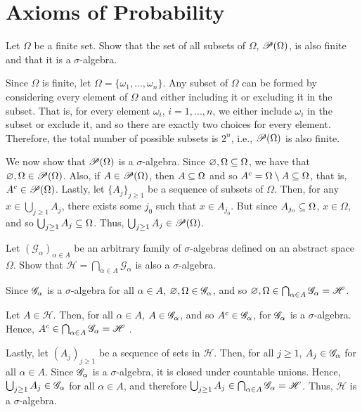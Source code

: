 \chapter{Axioms of Probability}

\begin{problem}
Let $\Omega$ be a finite set. Show that the set of all subsets of $\Omega$, $\mathscr{P}(\Omega)$, is also finite and that it is a $\sigma$-algebra.
\end{problem}

\begin{solution}
Since $\Omega$ is finite, let $\Omega = \{ \omega_1, ..., \omega_n\}$. Any subset of $\Omega$ can be formed by considering every element of $\Omega$ and either including it or excluding it in the subset. That is, for every element $\omega_i$, $i = 1, ..., n$, we either include $\omega_i$ in the subset or exclude it, and so there are exactly two choices for every element. Therefore, the total number of possible subsets is $2^n$, i.e., $\mathscr{P}(\Omega)$ is also finite.

We now show that $\mathscr{P}(\Omega)$ is a $\sigma$-algebra. Since $\varnothing, \Omega \subseteq \Omega$, we have that $\varnothing, \Omega \in \mathscr{P}(\Omega)$. Also, if $A \in \mathscr{P}(\Omega)$, then $A \subseteq \Omega$ and so $A^c = \Omega \setminus A \subseteq \Omega$, that is, $A^c \in \mathscr{P}(\Omega)$. Lastly, let $\{A_j\}_{j \geq 1}$ be a sequence of subsets of $\Omega$. Then, for any $x \in \bigcup_{j \geq 1} A_j$, there exists some $j_0$ such that $x \in A_{j_0}$. But since $A_{j_0} \subseteq \Omega$, $x \in \Omega$, and so $\bigcup_{j \geq 1} A_j \subseteq \Omega$. Thus, $\bigcup_{j \geq 1} A_j \in \mathscr{P}(\Omega)$.
\end{solution}


\begin{problem}
Let $(\mathscr{G}_\alpha)_{\alpha \in A}$ be an arbitrary family of $\sigma$-algebras defined on an abstract space $\Omega$. Show that $\mathscr{H} = \bigcap_{\alpha \in A} \mathscr{G}_\alpha$ is also a $\sigma$-algebra.
\end{problem}

\begin{solution}
Since $\mathscr{G}_\alpha$ is a $\sigma$-algebra for all $\alpha \in A$, $\varnothing, \Omega \in \mathscr{G}_\alpha$, and so $\varnothing, \Omega \in \bigcap_{\alpha \in A} \mathscr{G}_\alpha = \mathscr{H}$. 

Let $A \in \mathscr{H}$. Then, for all $\alpha \in A$, $A \in \mathscr{G}_\alpha$, and so $A^c \in \mathscr{G}_\alpha$, for $\mathscr{G}_\alpha$ is a $\sigma$-algebra. Hence, $A^c \in \bigcap_{\alpha \in A} \mathscr{G}_\alpha = \mathscr{H}$ .

Lastly, let $(A_j)_{j \geq 1}$ be a sequence of sets in $\mathscr{H}$. Then, for all $j \geq 1$, $A_j \in \mathscr{G}_\alpha$ for all $\alpha \in A$. Since $\mathscr{G}_\alpha$ is a $\sigma$-algebra, it is closed under countable unions. Hence, $\bigcup_{j \geq 1} A_j \in \mathscr{G}_{\alpha}$ for all $\alpha \in A$, and therefore $\bigcup_{j \geq 1} A_j \in \bigcap_{\alpha \in A} \mathscr{G}_\alpha = \mathscr{H}$. Thus, $\mathscr{H}$ is a $\sigma$-algebra.
\end{solution}

